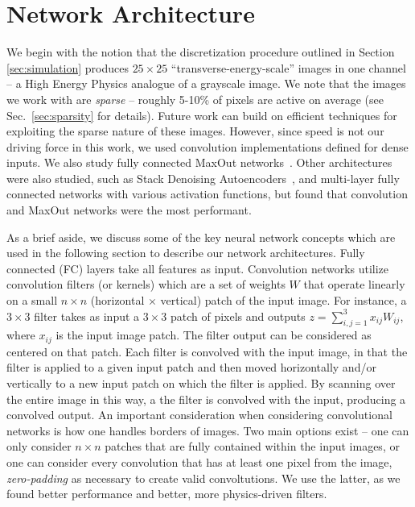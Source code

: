 
\section{Network Architecture}
\label{sec:arch}


We begin with the notion that the discretization procedure outlined in Section \ref{sec:simulation} produces $25\times 25$ ``transverse-energy-scale'' images in one channel -- a High Energy Physics analogue of a grayscale image. We note that the images we work with are \emph{sparse} -- roughly 5-10\% of pixels are active on average (see Sec.~\ref{sec:sparsity} for details). Future work can build on efficient techniques for exploiting the sparse nature of these images. However, since speed is not our driving force in this work, we used convolution implementations defined for dense inputs.  We also study fully connected MaxOut networks~\cite{maxout:goodfellow}.  Other architectures were also studied, such as Stack Denoising Autoencoders~\cite{SDAE}, and multi-layer fully connected networks with various activation functions, but found that convolution and MaxOut networks were the most performant.

As a brief aside, we discuss some of the key neural network concepts which are used in the following section to describe our network architectures.  Fully connected (FC) layers take all features as input.  Convolution networks utilize convolution filters (or kernels) which are a set of weights $W$ that operate linearly on a small $n\times n$ (horizontal $\times$ vertical) patch of the input image.  For instance, a $3\times3$ filter takes as input a $3\times3$ patch of pixels and outputs $z = \sum_{i,j=1}^{3} x_{ij}W_{ij}$, where $x_{ij}$ is the input image patch.  The filter output can be considered as centered on that patch.  Each filter is convolved with the input image, in that the filter is applied to a given input patch and then moved horizontally and/or vertically to a new input patch on which the filter is applied.  By scanning over the entire image in this way, a the filter is convolved with the input, producing a convolved output. An important consideration when considering convolutional networks is how one handles borders of images. Two main options exist -- one can only consider $n\times n$ patches that are fully contained within the input images, or one can consider every convolution that has at least one pixel from the image, \emph{zero-padding} as necessary to create valid convoltutions. We use the latter, as we found better performance and better, more physics-driven filters. 

